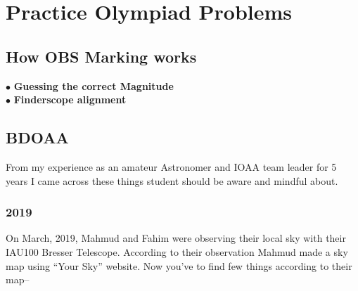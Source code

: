 \documentclass[a4paper,12pt]{extarticle}
\begin{document}
\section{Practice Olympiad Problems}


\subsection{How OBS Marking works}

$\bullet$ \textbf{Guessing the correct Magnitude}\\

$\bullet$ \textbf{Finderscope alignment}

\clearpage
\subsection{BDOAA}
From my experience as an amateur Astronomer and IOAA team leader for 5 years I came across these things student should be aware and mindful about. 
\subsubsection{2019}
On  March, 2019, Mahmud and Fahim were observing their local sky with their IAU100 Bresser Telescope. According to their observation Mahmud made a sky map using “Your Sky” website. Now you’ve to find few things according to their map--
\end{document}
